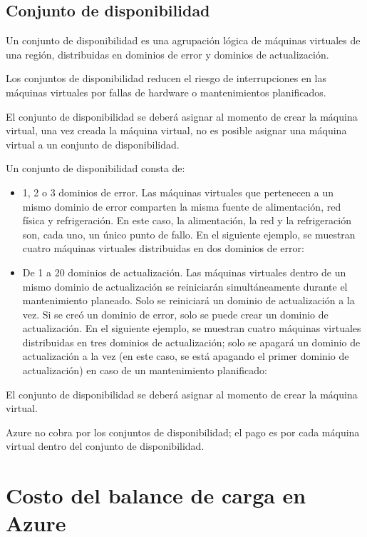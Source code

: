 \subsection{Conjunto de disponibilidad}

Un conjunto de disponibilidad es una agrupación lógica de máquinas virtuales de una región, distribuidas en dominios de error y dominios de actualización.

Los conjuntos de disponibilidad reducen el riesgo de interrupciones en las máquinas virtuales por fallas de hardware o mantenimientos planificados.

El conjunto de disponibilidad se deberá asignar al momento de crear la máquina virtual, una vez creada la máquina virtual, no es posible asignar una máquina virtual a un conjunto de disponibilidad.

Un conjunto de disponibilidad consta de:

\begin{itemize}
\item 1, 2 o 3 dominios de error. Las máquinas virtuales que pertenecen a un mismo dominio de error comparten la misma fuente de alimentación, red física y refrigeración. En este caso, la alimentación, la red y la refrigeración son, cada uno, un único punto de fallo. En el siguiente ejemplo, se muestran cuatro máquinas virtuales distribuidas en dos dominios de error:
\end{itemize}

\begin{itemize}
\item De 1 a 20 dominios de actualización. Las máquinas virtuales dentro de un mismo dominio de actualización se reiniciarán simultáneamente durante el mantenimiento planeado. Solo se reiniciará un dominio de actualización a la vez. Si se creó un dominio de error, solo se puede crear un dominio de actualización. En el siguiente ejemplo, se muestran cuatro máquinas virtuales distribuidas en tres dominios de actualización; solo se apagará un dominio de actualización a la vez (en este caso, se está apagando el primer dominio de actualización) en caso de un mantenimiento planificado:
\end{itemize}

El conjunto de disponibilidad se deberá asignar al momento de crear la máquina virtual.

Azure no cobra por los conjuntos de disponibilidad; el pago es por cada máquina virtual dentro del conjunto de disponibilidad.

\section{Costo del balance de carga en Azure}

